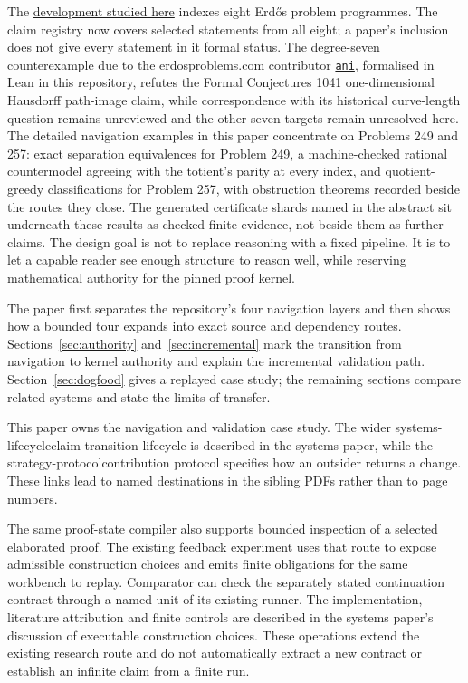 \documentclass[11pt]{article}
\newcommand{\repobase}{https://github.com/wcook04/plectis-erdos}
\begin{document}
The \href{\repobase}{development studied here} indexes eight Erd\H{o}s
problem programmes. The claim registry now covers selected statements from
all eight; a paper's inclusion does not give every statement in it formal
status. The degree-seven counterexample due to the erdosproblems.com
contributor
\href{https://www.erdosproblems.com/forum/thread/1041\#post-8861}{\texttt{ani}},
formalised in Lean in this repository, refutes the Formal Conjectures 1041
one-dimensional Hausdorff path-image claim, while correspondence with its
historical curve-length question remains unreviewed and the other seven
targets remain unresolved here.
The detailed navigation examples in this paper concentrate on Problems 249
and 257: exact
separation equivalences for Problem 249, a machine-checked rational
countermodel agreeing with the totient's parity at every index, and
quotient-greedy classifications for Problem 257, with obstruction theorems
recorded beside the routes they close. The generated certificate shards named
in the abstract sit underneath these results as checked finite evidence, not
beside them as further claims. The design goal is not
to replace reasoning with a fixed pipeline. It is to let a capable reader see
enough structure to reason well, while reserving mathematical authority for
the pinned proof kernel.

The paper first separates the repository's four navigation layers and then
shows how a bounded tour expands into exact source and dependency routes.
Sections~\ref{sec:authority} and~\ref{sec:incremental} mark the transition from
navigation to kernel authority and explain the incremental validation path.
Section~\ref{sec:dogfood} gives a replayed case study; the remaining sections
compare related systems and state the limits of transfer.

This paper owns the navigation and validation case study. The wider
%
{systems-lifecycle}{claim-transition lifecycle} is described in the systems
paper, while the
%
{strategy-protocol}{contribution protocol} specifies how an outsider returns a
change. These links lead to named destinations in the sibling PDFs rather than
to page numbers.

The same proof-state compiler also supports bounded inspection of a selected
elaborated proof. The existing feedback experiment uses that route to expose
admissible construction choices and emits finite obligations for the same
workbench to replay. Comparator can check the separately stated continuation
contract through a named unit of its existing runner. The implementation,
literature attribution and finite controls are described in the systems
paper's discussion of executable construction choices. These operations
extend the existing research route and do not automatically extract a new
contract or establish an infinite claim from a finite run.
\end{document}
